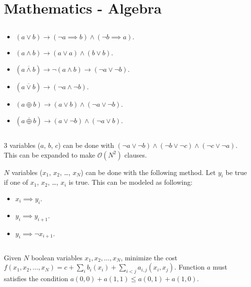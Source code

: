 \documentclass[landscape, 8pt, a4paper, oneside, twocolumn]{extarticle}
\begin{document}
\section{Mathematics - Algebra}
\subsection{}
\subsection{}
\begin{itemize}
	\item $(a \vee b) \to (\neg a \implies b) \wedge (\neg b \implies a)$.
	\item $(a \wedge b) \to (a \vee a) \wedge (b \vee b)$.
	\item $(a \overline{\wedge} b) \to \neg (a \wedge b) \to (\neg a \vee \neg b)$.
	\item $(a \overline{\vee} b) \to (\neg a \wedge \neg b)$.
	\item $(a \oplus b) \to (a \vee b) \wedge (\neg a \vee \neg b)$.
	\item $(a \overline{\oplus} b) \to (a \vee \neg b) \wedge (\neg a \vee b)$.
\end{itemize}
\subsection{}
$3$ variables ($a$, $b$, $c$) can be done with $(\neg a \vee \neg b) \wedge (\neg b \vee \neg c) \wedge (\neg c \vee \neg a)$. This can be expanded to make $\mathcal O(N^2)$ clauses.

$N$ variables ($x_1$, $x_2$, \ldots, $x_N$) can be done with the following method. Let $y_i$ be true if one of $x_1$, $x_2$, \ldots, $x_i$ is true. This can be modeled as following:
\begin{itemize}
	\item $x_i \implies y_i$.
	\item $y_i \implies y_{i+1}$.
	\item $y_i \implies \neg x_{i+1}$.
\end{itemize}
\subsection{}
Given $N$ boolean variables $x_{1}, x_{2}, \ldots, x_{N}$, minimize the cost $f(x_1, x_2, \ldots, x_N) = c + \sum_{i} b_i(x_i) + \sum_{i<j} a_{i,j}(x_i, x_j)$. Function $a$ must satisfies the condition $a(0,0) + a(1,1) \leq a(0,1) + a(1,0)$.
\end{document}
